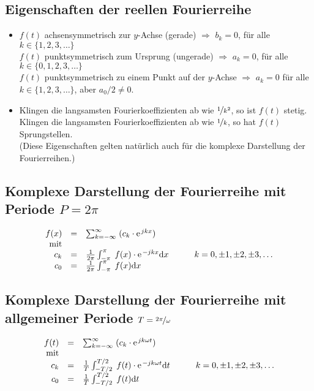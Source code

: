\subsection{Eigenschaften der reellen Fourierreihe}
\begin{itemize}
\item
$f(t)$ achsensymmetrisch zur $y$-Achse (gerade) $\Rightarrow$ $b_k = 0$, für alle $k \in \{1,2,3, \ldots \}$\\ 
$f(t)$ punktsymmetrisch zum Ursprung (ungerade) $\Rightarrow$ $a_k = 0$, für alle $k \in \{0,1,2,3, \ldots \}$\\
$f(t)$ punktsymmetrisch zu einem Punkt auf der $y$-Achse $\Rightarrow$ $a_k = 0$ für alle $k \in \{1,2,3, \ldots \}$, aber $a_0 / 2 \ne 0$. 
\item
	Klingen die \glqq{}langsamsten\grqq{} Fourierkoeffizienten ab wie $\nicefrac{1}{k^2}$, so ist $f(t)$ stetig.\\
	Klingen die \glqq{}langsamsten\grqq{} Fourierkoeffizienten ab wie $\nicefrac{1}{k}$, so hat $f(t)$ Sprungstellen.\\
(Diese Eigenschaften gelten natürlich auch für die komplexe Darstellung der Fourierreihen.)
\end{itemize}

\subsection[Fourierreihe komplex mit Periode $P=2\pi$]{Komplexe Darstellung der Fourierreihe mit Periode $P=2 \pi$}
\begin{align*}
\begin{array}{rcll}
f(x) & = & \sum_{k=-\infty}^{\infty} \; (c_k \cdot \e^{jkx}) & {}\\ 
\mbox{mit} & {} & {} & {}\\
	c_k & = & \frac{1}{2 \pi} \int_{-\pi}^{\pi} \; f(x) \cdot \e^{-jkx} \mathrm{d}x & \qquad k = 0,\pm 1,\pm 2,\pm 3, \ldots\\ 
	c_0 & = & \frac{1}{2 \pi} \int_{-\pi}^{\pi} \; f(x) \mathrm{d}x
\end{array}
\end{align*}
\subsection[Fourierreihe komplex mit Periode $T=\nicefrac{2\pi}{\omega}$]{Komplexe Darstellung der Fourierreihe mit allgemeiner Periode $T=\nicefrac{2 \pi}{\omega}$}
\begin{align*}
\begin{array}{rcll}
f(t) & = & \sum_{k=-\infty}^{\infty} \; (c_k \cdot \e^{jk \omega t}) & {}\\ 
\mbox{mit} & {} & {} & {}\\
	c_k & = & \frac{1}{T} \int_{-T/2}^{T/2} \; f(t) \cdot \e^{-jk \omega t} \mathrm{d}t & \qquad k = 0,\pm 1,\pm 2,\pm 3, \ldots\\ 
	c_0 & = & \frac{1}{T} \int_{-T/2}^{T/2} \; f(t) \mathrm{d}t
\end{array}
\end{align*}

